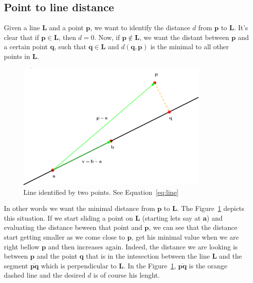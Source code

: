 \subsection{Point to line distance}
\label{sec:point2line}

Given a line $\mathbf{L}$ and a point $\mathbf{p}$, we want to identify the distance $d$ from $\mathbf{p}$ to $\mathbf{L}$.
It's clear that if $\mathbf{p} \in \mathbf{L}$, then $d = 0$.
Now, if $\mathbf{p} \notin \mathbf{L}$, we want the distant between $\mathbf{p}$ and a certain point $\mathbf{q}$, such that $\mathbf{q} \in \mathbf{L}$ and $d(\mathbf{q}, \mathbf{p})$ is the minimal to all other points in $\mathbf{L}$.

\begin{figure}[htb]
  \centering
  \includegraphics[width=0.85\textwidth]{img/line2point}
  \caption{Line identified by two points. See Equation~\ref{eq:line} }
  \label{fig:point2line}
\end{figure}

In other words we want the minimal distance from $\mathbf{p}$ to $\mathbf{L}$.
The Figure~\ref{fig:point2line} depicts this situation.
If we start sliding a point on $\mathbf{L}$ (starting lets say at $\mathbf{a}$) and evaluating the distance beween that point and $\mathbf{p}$, we can see that the distance start getting smaller as we come close to $\mathbf{p}$, get his minimal value when we are right bellow $\mathbf{p}$ and then increases again. 
Indeed, the distance we are looking is between $\mathbf{p}$ and the point $\mathbf{q}$ that is in the intesection between the line $\mathbf{L}$ and the segment $\overline{\mathbf{p} \mathbf{q}}$ which is perpendicular to $\mathbf{L}$.
In the Figure~\ref{fig:point2line}, $\overline{\mathbf{p} \mathbf{q}}$ is the orange dashed line and the desired $d$ is of course his lenght.

